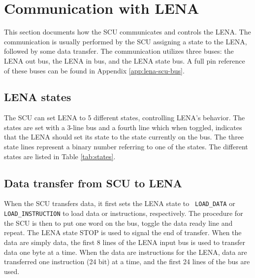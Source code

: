 \section{Communication with LENA}
\label{sec:SCU-LENA-communication}

This section documents how the \ac{SCU} communicates and controls the
\ac{LENA}. The communication is usually performed by the \ac{SCU} assigning a
state to the \ac{LENA}, followed by some data transfer. The communication utilizes three buses: 
the LENA out bus, the LENA in bus, and the LENA state bus. A full pin reference of these buses can
be found in Appendix \ref{app:lena-scu-bus}.

\subsection{LENA states}

The \ac{SCU} can set \ac{LENA} to 5 different states, controlling \ac{LENA}'s
behavior. The states are set with a 3-line bus and a fourth line which when
toggled, indicates that the \ac{LENA} should set its state to the state
currently on the bus. The three state lines represent a binary number referring
to one of the states. The different states are listed in Table \ref{tab:states}.



\subsection{Data transfer from SCU to LENA}
When the \ac{SCU} transfers data, it first sets the \ac{LENA} state to {\tt
  LOAD\_DATA} or {\tt LOAD\_INSTRUCTION} to load data or instructions,
respectively. The procedure for the \ac{SCU} is then to put one word on the bus,
toggle the data ready line and repeat. The \ac{LENA} state STOP is used to signal the
end of transfer. When the data are simply data, the first 8 lines of
the \ac{LENA} input bus is used to transfer data one byte at a time. When the
data are instructions for the \ac{LENA}, data are transferred one instruction (24
bit) at a time, and the first 24 lines of the bus are used.


